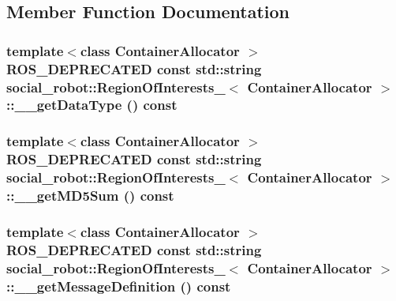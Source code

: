 \subsection{Member Function Documentation}
\hypertarget{structsocial__robot_1_1RegionOfInterests___a5064ede85ae1dab081b84f6d19070376}{
\subsubsection[{\_\-\_\-getDataType}]{\setlength{\rightskip}{0pt plus 5cm}template$<$class ContainerAllocator $>$ ROS\_\-DEPRECATED const std::string {\bf social\_\-robot::RegionOfInterests\_\-}$<$ ContainerAllocator $>$::\_\-\_\-getDataType () const}}
\label{structsocial__robot_1_1RegionOfInterests___a5064ede85ae1dab081b84f6d19070376}
\hypertarget{structsocial__robot_1_1RegionOfInterests___ad74ffca1d153777b741887fd1506438f}{
\subsubsection[{\_\-\_\-getMD5Sum}]{\setlength{\rightskip}{0pt plus 5cm}template$<$class ContainerAllocator $>$ ROS\_\-DEPRECATED const std::string {\bf social\_\-robot::RegionOfInterests\_\-}$<$ ContainerAllocator $>$::\_\-\_\-getMD5Sum () const}}
\label{structsocial__robot_1_1RegionOfInterests___ad74ffca1d153777b741887fd1506438f}
\hypertarget{structsocial__robot_1_1RegionOfInterests___ae30b59434e53419e80a04f26d51c28ca}{
\subsubsection[{\_\-\_\-getMessageDefinition}]{\setlength{\rightskip}{0pt plus 5cm}template$<$class ContainerAllocator $>$ ROS\_\-DEPRECATED const std::string {\bf social\_\-robot::RegionOfInterests\_\-}$<$ ContainerAllocator $>$::\_\-\_\-getMessageDefinition () const}}
